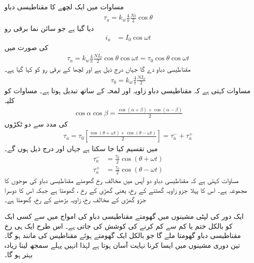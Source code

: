مساوات   میں ایک لچھے کا مقناطیسی دباو
\begin{align}
\tau_a=k_w \frac{4}{\pi}\frac{Ni}{2} \cos \theta
\end{align}
دیا گیا ہے جو  سائن نما برقی رو
\begin{align}
i_a&=I_0 \cos \omega t
\end{align}
کی صورت میں
\begin{align}\label{مساوات_گھومتے_مشین_دباو_زاویہ_اور_وقت_پر_منحصر}
\tau_a=k_w \frac{4}{\pi} \frac{N I_0}{2} \cos \theta \cos \omega t=\tau_0 \cos \theta \cos \omega t
\end{align}
مقناطیسی دباو دے گا جہاں  درج ذیل ہے اور لچھا کے برقی رو کو  کہا گیا ہے۔
\begin{align}
\tau_0=k_w \frac{4}{\pi} \frac{N I_0}{2}
\end{align}
مساوات   کہتی ہے کہ  مقناطیسی دباو زاویہ  اور لمحہ  کے ساتھ تبدیل ہوتا ہے۔ مساوات  کو کلیہ 
\begin{align}\label{مساوات_گھومتے_مشین_کو_سائن_ٹکڑے}
\cos \alpha \cos \beta =\frac{\cos (\alpha +\beta) +\cos (\alpha -\beta)}{2}
\end{align}
کی مدد سے دو ٹکڑوں 
\begin{align}\label{مساوات_گھومتے_مشین_دو_مخالف_گھومتے_اجزاء}
\tau_a=\tau_0 \left [\frac{\cos (\theta +\omega t) +\cos (\theta -\omega t)}{2}\right]=\tau_a^{-}+\tau_a^{+}
\end{align}
میں تقسیم کیا جا سکتا ہے جہاں  اور  درج ذیل ہوں گے۔
\begin{align}
\tau_a^{-}&=\frac{\tau_0}{2} \cos (\theta +\omega t)\\
\tau_a^{+}&=\frac{\tau_0}{2} \cos (\theta -\omega t)
\end{align}
مساوات   کہتی ہے کہ  مقناطیسی دباو دو آپس میں مخالف رخ گھومتے  مقناطیسی دباو کی موجوں کا مجموعہ ہے۔ اس کا پہلا جزو  زاویہ  گھٹنے کے رخ،  یعنی گھڑی کے رخ ، گھومتا ہے جبکہ اس کا دوسرا جزو  گھڑی کے مخالف رخ، زاویہ بڑھنے کے رخ،  گھومتا ہے۔

ایک دور کی لپٹی مشینوں میں گھومتے مقناطیسی دباو کی امواج میں سے کسی ایک کو بالکل ختم یا کم سے کم کرنے کی کوشش کی جاتی ہے۔ اس طرح ایک ہی رخ  مقناطیسی دباو گھومتا ملے گا جو بالکل  ایک گھومتے ہوئے  مقناطیس کی مانند ہو گا۔ تین دوری  مشینوں میں ایسا کرنا نہایت آسان ہوتا ہے لہٰذا انہیں پہلے سمجھ لینا زیادہ بہتر ہو گا۔


